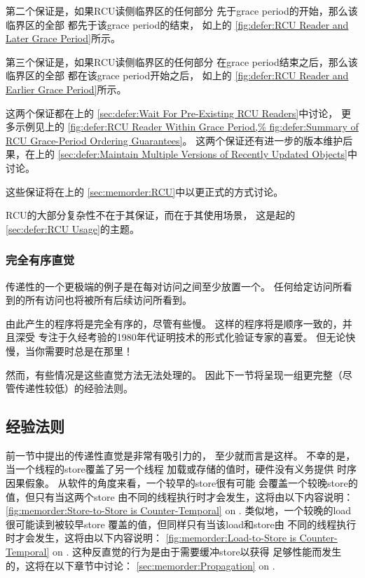 第二个保证是，如果RCU读侧临界区的任何部分
先于grace period的开始，那么该临界区的全部
都先于该grace period的结束，
如上的
\cref{fig:defer:RCU Reader and Later Grace Period}所示。

第三个保证是，如果RCU读侧临界区的任何部分
在grace period结束之后，那么该临界区的全部
都在该grace period开始之后，
如上的
\cref{fig:defer:RCU Reader and Earlier Grace Period}所示。

这两个保证都在上的
\cref{sec:defer:Wait For Pre-Existing RCU Readers}中讨论，
更多示例见上的
\cref{fig:defer:RCU Reader Within Grace Period,%
fig:defer:Summary of RCU Grace-Period Ordering Guarantees}。
这两个保证还有进一步的版本维护后果，在上的
\cref{sec:defer:Maintain Multiple Versions of Recently Updated Objects}中讨论。

这些保证将在上的
\cref{sec:memorder:RCU}中以更正式的方式讨论。

RCU的大部分复杂性不在于其保证，而在于其使用场景，
这是起的
\cref{sec:defer:RCU Usage}的主题。

\subsubsection{完全有序直觉}
\label{sec:memorder:Fully Ordered Intuitions}

传递性的一个更极端的例子是在每对访问之间至少放置一个。
任何给定访问所看到的所有访问也将被所有后续访问所看到。

由此产生的程序将是完全有序的，尽管有些慢。
这样的程序将是顺序一致的，并且深受
专注于久经考验的1980年代证明技术的形式化验证专家的喜爱。
但无论快慢，当你需要时总是在那里！

然而，有些情况是这些直觉方法无法处理的。
因此下一节将呈现一组更完整（尽管传递性较低）的经验法则。

\subsection{经验法则}
\label{sec:memorder:Rules of Thumb}

前一节中提出的传递性直觉是非常有吸引力的，
至少就而言是这样。
不幸的是，当一个线程的store覆盖了另一个线程
加载或存储的值时，硬件没有义务提供
时序因果假象。
从软件的角度来看，一个较早的store很有可能
会覆盖一个较晚store的值，但只有当这两个store
由不同的线程执行时才会发生，这将由以下内容说明：
\cref{fig:memorder:Store-to-Store is Counter-Temporal}
on
.
类似地，一个较晚的load很可能读到被较早store
覆盖的值，但同样只有当该load和store由
不同的线程执行时才会发生，这将由以下内容说明：
\cref{fig:memorder:Load-to-Store is Counter-Temporal}
on
.
这种反直觉的行为是由于需要缓冲store以获得
足够性能而发生的，这将在以下章节中讨论：
\cref{sec:memorder:Propagation}
on
.

